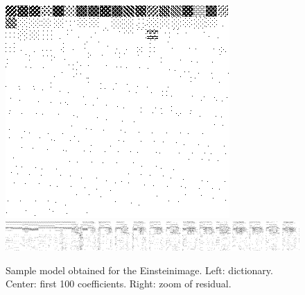 \documentclass[twocolumn]{IEEEtran}
\theoremstyle{definition}
\begin{document}
\begin{figure}
\includegraphics[width=\columnwidth]{fig/einstein_mob_dict.png} %
\includegraphics[width=\columnwidth]{fig/einstein_mob_coef_crop.png}
\caption{\label{fig:einstein-mob} Sample model obtained for the Einsteinimage. Left: dictionary. Center: first 100 coefficients. Right: zoom of residual. }
\end{figure}
%
%
\end{document}
